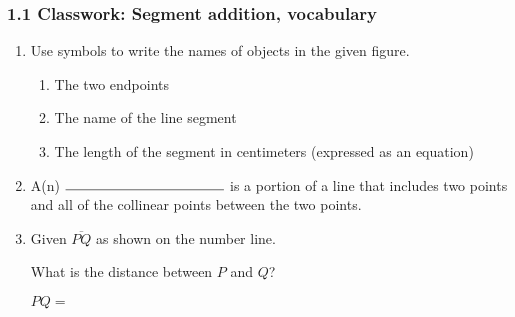 

\fancyhead[LE]{\thepage}



\subsubsection*{1.1 Classwork: Segment addition, vocabulary}
\begin{enumerate}
\item Use symbols to write the names of objects in the given figure.
\begin{multicols}{2}
   \par
\columnbreak
\begin{enumerate}[itemsep=1cm]
  \item The two endpoints
  \item The name of the line segment
  \item The length of the segment in centimeters (expressed as an equation)
\end{enumerate}
\end{multicols} \vspace{1cm}

\item A(n) $\rule{4cm}{0.15mm}$ is a portion of a line that includes two points and all of the collinear points between the two points. \bigskip

\item Given $\overline{PQ}$ as shown on the number line. \par \smallskip
   \par \smallskip
  What is the distance between $P$ and $Q$? \par \smallskip
    $PQ=$ \vspace{1cm}


\end{enumerate}
